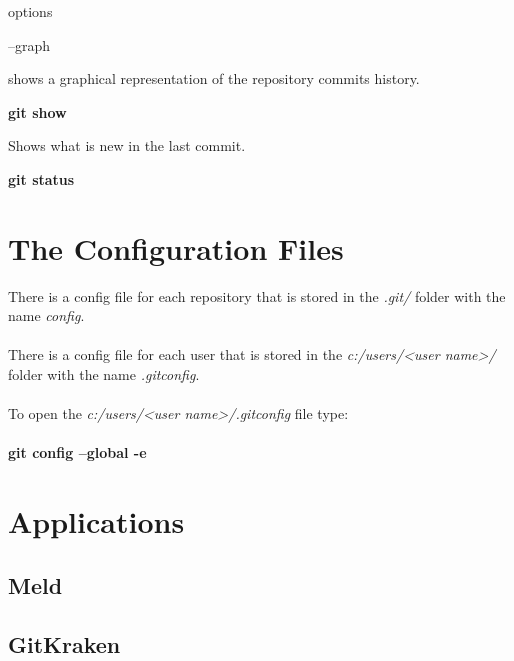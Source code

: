 options

--graph

 shows a graphical representation of the repository commits history.

\textbf{git show}

Shows what is new in the last commit.

\textbf{git status}

\section{The Configuration Files}

There is a config file for each repository that is stored in the \emph{.git/} folder with the name \emph{config}.\\
\\
There is a config file for each user that is stored in the \emph{c:/users/<user name>/} folder with the name \emph{.gitconfig}.\\
\\
To open the \emph{c:/users/<user name>/.gitconfig} file type:\\
\\
\textbf{git config --global -e}

\section{Applications}

\subsection{Meld}

%
%
%	
%
%
%
%

\subsection{GitKraken}


